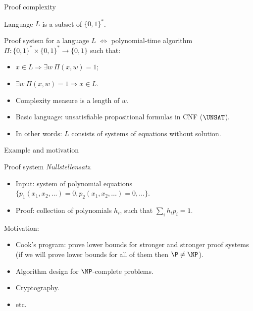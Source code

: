 \begin{frame}{Proof complexity}

    Language $L$ is a subset of $\{0, 1\}^*$.

    \begin{definition}
        Proof system for a language $L$ $\Leftrightarrow$ polynomial-time algorithm $\Pi\colon \{0,
        1\}^* \times \{0, 1\}^* \rightarrow \{0, 1\}$ such that:
        \begin{itemize}
            \item $x \in L \Rightarrow \exists w ~ \Pi(x, w) = 1$;
            \item $\exists w ~ \Pi(x, w) = 1 \Rightarrow x \in L$.
        \end{itemize}
    \end{definition}

    \pause
    \begin{itemize}
        \item Complexity measure is a length of $w$.
        \item Basic language: unsatisfiable propositional formulas in CNF ($\UNSAT$).
        \item In other words: $L$ consists of systems of equations without solution.
    \end{itemize}
 
\end{frame}


\begin{frame}{Example and motivation}

    Proof system \textit{Nullstellensatz}.
    \begin{itemize}
        \item Input: system of polynomial equations $\{p_1(x_1, x_2, \dots) = 0, p_2(x_1, x_2, \dots) =
            0, \dots\}$.
            \pause
        \item Proof: collection of polynomials $h_i$, such that $\sum\limits_{i} h_i p_i = 1$.
    \end{itemize}

    Motivation:
    \begin{itemize}
        \item Cook's program: prove lower bounds for stronger and stronger proof systems (if we will
            prove lower bounds for all of them then $\P \neq \NP$).
        \pause
        \item Algorithm design for $\NP$-complete problems.
        \pause
        \item Cryptography.
        \item etc.
    \end{itemize}
\end{frame}


